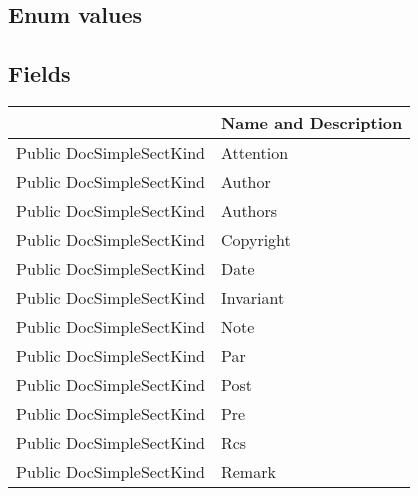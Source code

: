 \documentclass[11pt, oneside, a4paper]{book}
\begin{document}
\subsection{Enum values}

\subsection{Fields}
\begin{center}
\begin{tabular}{| p{3cm} | p{12cm} | }
\hline
\textbf{ } & \textbf{ Name and Description}\\
\hline
 Public  DocSimpleSectKind &  Attention\hypertarget{SoftwareEngineeringTools.{}Documentation.{}DocSimpleSectKind.{}Attention}{}\\
\hline
 Public  DocSimpleSectKind &  Author\hypertarget{SoftwareEngineeringTools.{}Documentation.{}DocSimpleSectKind.{}Author}{}\\
\hline
 Public  DocSimpleSectKind &  Authors\hypertarget{SoftwareEngineeringTools.{}Documentation.{}DocSimpleSectKind.{}Authors}{}\\
\hline
 Public  DocSimpleSectKind &  Copyright\hypertarget{SoftwareEngineeringTools.{}Documentation.{}DocSimpleSectKind.{}Copyright}{}\\
\hline
 Public  DocSimpleSectKind &  Date\hypertarget{SoftwareEngineeringTools.{}Documentation.{}DocSimpleSectKind.{}Date}{}\\
\hline
 Public  DocSimpleSectKind &  Invariant\hypertarget{SoftwareEngineeringTools.{}Documentation.{}DocSimpleSectKind.{}Invariant}{}\\
\hline
 Public  DocSimpleSectKind &  Note\hypertarget{SoftwareEngineeringTools.{}Documentation.{}DocSimpleSectKind.{}Note}{}\\
\hline
 Public  DocSimpleSectKind &  Par\hypertarget{SoftwareEngineeringTools.{}Documentation.{}DocSimpleSectKind.{}Par}{}\\
\hline
 Public  DocSimpleSectKind &  Post\hypertarget{SoftwareEngineeringTools.{}Documentation.{}DocSimpleSectKind.{}Post}{}\\
\hline
 Public  DocSimpleSectKind &  Pre\hypertarget{SoftwareEngineeringTools.{}Documentation.{}DocSimpleSectKind.{}Pre}{}\\
\hline
 Public  DocSimpleSectKind &  Rcs\hypertarget{SoftwareEngineeringTools.{}Documentation.{}DocSimpleSectKind.{}Rcs}{}\\
\hline
 Public  DocSimpleSectKind &  Remark\hypertarget{SoftwareEngineeringTools.{}Documentation.{}DocSimpleSectKind.{}Remark}{}\\

\end{tabular}
\end{center}
\end{document}
